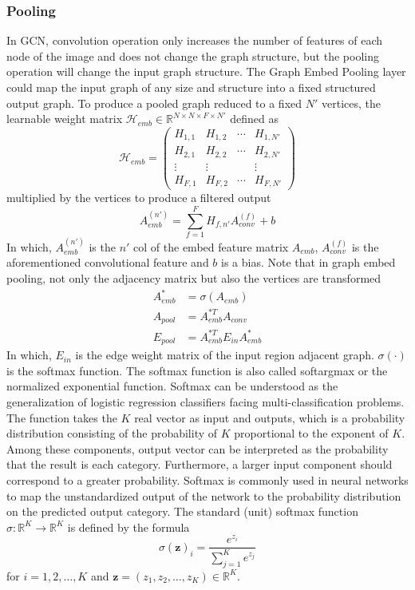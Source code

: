 \documentclass[11pt]{article}
\begin{document}
\subsubsection{Pooling}
In GCN, convolution operation only increases the number of features of each node of the image and does not change the graph structure, but the pooling operation will change the input graph structure. The Graph Embed Pooling layer could map the input graph of any size and structure into a fixed structured output graph. To produce a pooled graph reduced to a fixed $N'$ vertices, the learnable weight matrix $\mathcal{H}_{emb}\in\mathbb{R}^{N\times N\times F\times N'}$ defined as
\begin{equation}
	\mathcal{H}_{emb} = \begin{pmatrix} H_{1,1} & H_{1,2}  & \cdots &  H_{1,N'}\\ 
	 H_{2,1} & H_{2,2}  & \cdots &  H_{2,N'}\\
	\vdots &\vdots &&\vdots\\
	 H_{F,1} & H_{F,2}  & \cdots &  H_{F,N'}\end{pmatrix}
\end{equation}
multiplied by the vertices to produce a filtered output
\begin{equation}
	A_{emb}^{(n')}=\sum_{f=1}^{F}H_{f,n'}A_{conv}^{(f)}+b
\end{equation}
In which, $A_{emb}^{(n')}$ is the $n'$ col of the embed feature matrix $A_{emb}$, $A_{conv}^{(f)}$ is the aforementioned convolutional feature and $b$ is a bias. Note that in graph embed pooling, not only the adjacency matrix but also the vertices are transformed
\begin{equation}
\begin{aligned}
	A_{emb}^*&=\sigma(A_{emb})\\
	A_{pool}&=A_{emb}^{*T}A_{conv}\\
	E_{pool}&=A_{emb}^{*T}E_{in}A_{emb}^{*}
\end{aligned}
\end{equation}
In which, $E_{in}$ is the edge weight matrix of the input region adjacent graph. $\sigma(\cdot)$ is the softmax function. The softmax function is also called softargmax or the normalized exponential function. Softmax can be understood as the generalization of logistic regression classifiers facing multi-classification problems. The function takes the $K$ real vector as input and outputs, which is a probability distribution consisting of the probability of $K$ proportional to the exponent of $K$. Among these components, output vector can be interpreted as the probability that the result is each category. Furthermore, a larger input component should correspond to a greater probability. Softmax is commonly used in neural networks to map the unstandardized output of the network to the probability distribution on the predicted output category. The standard (unit) softmax function $\sigma:\mathbb{R}^{K}\rightarrow \mathbb {R}^{K}$ is defined by the formula
\begin{equation}
	\sigma(\mathbf{z})_i=\frac{e^{z_i}}{\sum_{j=1}^Ke^{z_j}}
\end{equation}
for $i = 1,2,\dots,K$ and $\mathbf{z}=(z_1,z_2,\dots,z_K)\in\mathbb{R}^K$.
\end{document}
